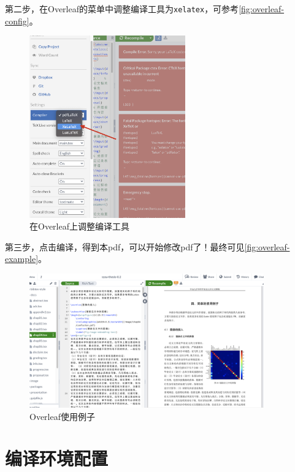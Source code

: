 第二步，在Overleaf的菜单中调整编译工具为\texttt{xelatex}，可参考\autoref{fig:overleaf-config}。

\begin{figure}[h]
	\centering
	\includegraphics[width=0.6\textwidth]{image/chap03/overleaf-config.jpg}
	\caption{在Overleaf上调整编译工具}
	\label{fig:overleaf-config}
\end{figure}


第三步，点击编译，得到本pdf，可以开始修改pdf了！最终可见\autoref{fig:overleaf-example}。


\begin{figure}[h]
	\centering
	\includegraphics[width=0.9\textwidth]{image/chap03/overleaf-example.jpg}
	\caption{Overleaf使用例子}
	\label{fig:overleaf-example}
\end{figure}



\section{编译环境配置}

